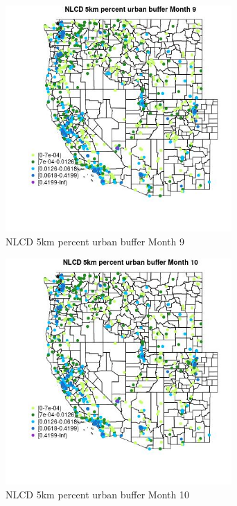 \begin{figure} 
\centering  
\includegraphics[width=0.77\textwidth]{Code_Outputs/Report_ML_input_PM25_Step4_part_e_de_duplicated_aves_compiled_2019-05-21wNAs_MapObsMo9NLCD_5km_percent_urban_buffer.jpg} 
\caption{\label{fig:Report_ML_input_PM25_Step4_part_e_de_duplicated_aves_compiled_2019-05-21wNAsMapObsMo9NLCD_5km_percent_urban_buffer}NLCD 5km percent urban buffer Month 9} 
\end{figure} 
 

\begin{figure} 
\centering  
\includegraphics[width=0.77\textwidth]{Code_Outputs/Report_ML_input_PM25_Step4_part_e_de_duplicated_aves_compiled_2019-05-21wNAs_MapObsMo10NLCD_5km_percent_urban_buffer.jpg} 
\caption{\label{fig:Report_ML_input_PM25_Step4_part_e_de_duplicated_aves_compiled_2019-05-21wNAsMapObsMo10NLCD_5km_percent_urban_buffer}NLCD 5km percent urban buffer Month 10} 
\end{figure} 
 

